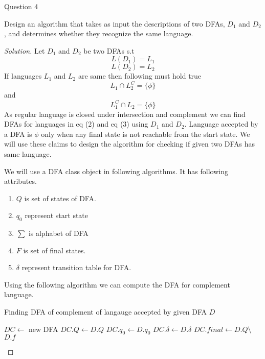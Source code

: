 \begin{solution}{Question 4}\label{ques:4}
    \begin{question}
    Design an algorithm that takes as input the descriptions of two DFAs, $D_1$ and $D_2$, and
    determines whether they recognize the same language.
    \end{question}
    \tcblower{}
    \begin{proof}[Solution]
        Let $D_1$ and $D_2$ be two DFAs s.t 
        \[L(D_1) = L_1 \]
        \[L(D_2) = L_2 \]
        If languages $L_1$ and $L_2$ are same then following must hold true
        \begin{equation}
            L_1 \cap L_2^C = \{\phi\}
        \end{equation}
        and
        \begin{equation}
            L_1^C \cap L_2 = \{\phi\}
        \end{equation}
        As regular language is closed under intersection and complement we can find DFAs for languages in eq (2) and eq (3) using $D_1$ and $D_2$. Language accepted by a DFA is ${\phi}$ only when any final state is not reachable from the start state. We will use these claims to design the algorithm for checking if given two DFAs has same language.
        
        We will use a DFA class object in following algorithms. It has following attributes.
        \begin{enumerate}
            \item $Q$ is set of states of DFA.
            \item $q_0$ represent start state
            \item $\sum$ is alphabet of DFA
            \item $F$ is set of final states.
            \item $\delta$ represent transition table for DFA.
        \end{enumerate}
        Using the following algorithm we can compute the DFA for complement language.
        \begin{algorithm}[H]
            \caption{Finding DFA of complement of langauge accepted by given DFA $D$}
            \begin{algorithmic}[1]
                    \State $DC \gets$ new DFA
                    \State $DC.Q \gets D.Q$
                    \State $DC.q_0 \gets D.q_0$
                    \State $DC.\delta \gets D.\delta$
                    \State $DC.final \gets D.Q \setminus$ $D.f$ 
                \EndProcedure{}
            \end{algorithmic}
        \end{algorithm}
        

\end{proof}
\end{solution}

